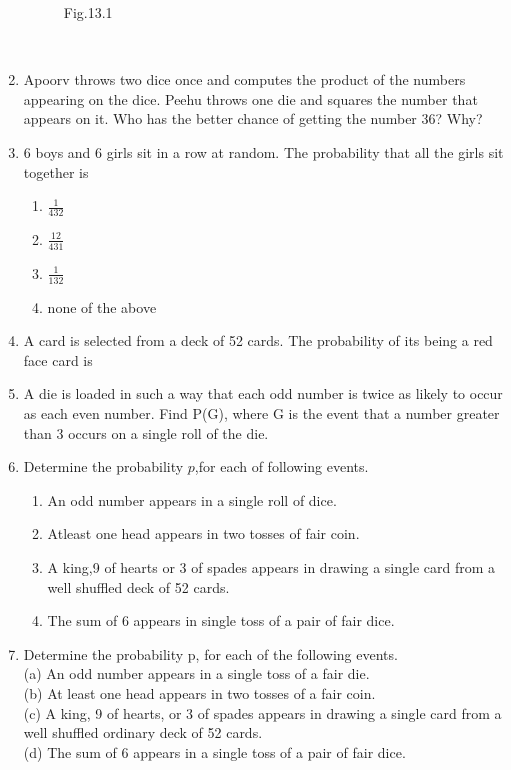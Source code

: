 \begin{enumerate}[label=\thesection.\arabic*,ref=\thesection.\theenumi]
\begin{figure}[!ht]
\begin{center}
		\resizebox{\columnwidth}{!}{}
	\end{center}
	\caption{Fig.13.1}
	\label{fig:circle.tex}	
\end{figure}\\
\solution

\item Apoorv throws two dice once and computes the product of the numbers appearing on the dice. Peehu throws one die and squares the number that appears on it. Who has the better chance of getting the number 36? Why?\\
\solution

\item 6 boys and 6 girls sit in a row at random. The probability that all the girls sit
together is
\begin{enumerate}
	\item $\frac{1}{432}$
	\item $\frac{12}{431}$
	\item $\frac{1}{132}$
	\item none of the above 
\end{enumerate}
			
\item A card is selected from a deck of 52 cards. The probability of its being a red face card is

\item A die is loaded in such a way that each odd number is twice as likely to occur as each even number. Find P(G), where G is the event that a number greater than 3 occurs on a single roll of the die.\\


\item Determine the probability $p$,for each of following events.
\begin{enumerate}
\item An odd number appears in a single roll of dice.
\item Atleast one head appears in two tosses of fair coin.
\item A king,9 of hearts or 3 of spades appears in drawing a single card from a well shuffled deck of 52 cards.
\item The sum of 6 appears in single toss of a pair of fair dice.
\end{enumerate}

\item Determine the probability p, for each of the following events.\\
(a) An odd number appears in a single toss of a fair die.\\
(b) At least one head appears in two tosses of a fair coin.\\
(c) A king, 9 of hearts, or 3 of spades appears in drawing a single card from a
well shuffled ordinary deck of 52 cards.\\
(d) The sum of 6 appears in a single toss of a pair of fair dice.

\end{enumerate}
